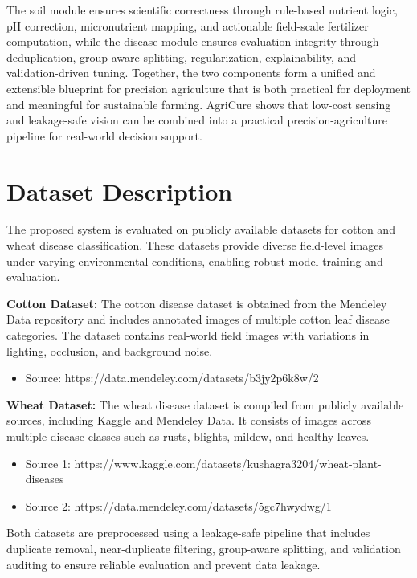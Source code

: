 \documentclass[conference]{IEEEtran}
\begin{document}
The soil module ensures scientific correctness through rule-based nutrient logic, pH correction, micronutrient mapping, and actionable field-scale fertilizer computation, while the disease module ensures evaluation integrity through deduplication, group-aware splitting, regularization, explainability, and validation-driven tuning. Together, the two components form a unified and extensible blueprint for precision agriculture that is both practical for deployment and meaningful for sustainable farming. AgriCure shows that low-cost sensing and leakage-safe vision can be combined into a practical precision-agriculture pipeline for real-world decision support.

\section{Dataset Description}

The proposed system is evaluated on publicly available datasets for cotton and wheat disease classification. These datasets provide diverse field-level images under varying environmental conditions, enabling robust model training and evaluation.

\textbf{Cotton Dataset:} The cotton disease dataset is obtained from the Mendeley Data repository and includes annotated images of multiple cotton leaf disease categories. The dataset contains real-world field images with variations in lighting, occlusion, and background noise.

\begin{itemize}
\item Source: https://data.mendeley.com/datasets/b3jy2p6k8w/2
\end{itemize}

\textbf{Wheat Dataset:} The wheat disease dataset is compiled from publicly available sources, including Kaggle and Mendeley Data. It consists of images across multiple disease classes such as rusts, blights, mildew, and healthy leaves.

\begin{itemize}
\item Source 1: https://www.kaggle.com/datasets/kushagra3204/wheat-plant-diseases
\item Source 2: https://data.mendeley.com/datasets/5gc7hwydwg/1
\end{itemize}

Both datasets are preprocessed using a leakage-safe pipeline that includes duplicate removal, near-duplicate filtering, group-aware splitting, and validation auditing to ensure reliable evaluation and prevent data leakage.
\end{document}

